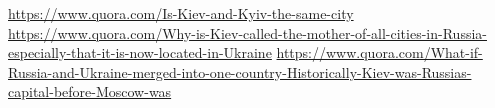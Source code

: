  
 
 
 
 

\url{https://www.quora.com/Is-Kiev-and-Kyiv-the-same-city}
\url{https://www.quora.com/Why-is-Kiev-called-the-mother-of-all-cities-in-Russia-especially-that-it-is-now-located-in-Ukraine}
\url{https://www.quora.com/What-if-Russia-and-Ukraine-merged-into-one-country-Historically-Kiev-was-Russias-capital-before-Moscow-was}





